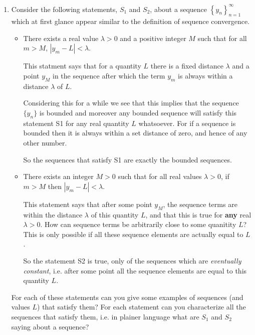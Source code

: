 \documentclass[oneside,10pt]{amsart}
\newcounter{pass}
\begin{document}
\begin{enumerate}
\item
Consider the following statements, $S_1$ and $S_2$, about a sequence $\left \{ y_n \right \}_{n=1}^\infty$ which at first glance appear similar to the definition of sequence convergence.
    \begin{itemize}
    \item[\textbf{S1:}]
    There exists a real value $\lambda > 0$ and a positive integer $M$ such that for all $m > M$, $\left | y_m - L \right | < \lambda$.
\begin{solution}{This statment says that for a quantity $L$ there is a fixed distance $\lambda$ and a point $y_M$ in the sequence after which the term $y_m$ is always within a distance $\lambda$ of $L$.

Considering this for a while we see that this implies that the sequence $\{y_n\}$ is bounded and moreover any bounded sequence will satisfy this statement S1 for any real quantity $L$ whatsoever. For if a sequence is bounded then it is always within a set distance of zero, and hence of any other number.

So the sequences that satisfy S1 are exactly the bounded sequences.}\end{solution}
    \item[\textbf{S2:}]
    There exists an integer $M > 0$ such that for all real values $\lambda > 0$, if $m > M$ then $\left | y_m - L \right | < \lambda$.
\begin{solution}{This statement says that after some point $y_M$, the sequence terms are within the distance $\lambda$ of this quantity $L$, and that this is true for \textbf{any} real $\lambda > 0$. How can sequence terms be arbitrarily close to some quanitity $L$? This is only possible if all these sequence elements are actually equal to $L$.

So the statement S2 is true, only of the sequences which are \emph{eventually constant}, i.e. after some point all the sequence elements are equal to this quantity $L$.}\end{solution}
    \end{itemize}
For each of these statements can you give some examples of sequences (and values $L$) that satisfy them? For each statement can you characterize all the sequences that satisfy them, i.e. in plainer language what are $S_1$ and $S_2$ saying about a sequence?

\setcounter{pass}{\value{enumi}}
\end{enumerate}
\end{document}

